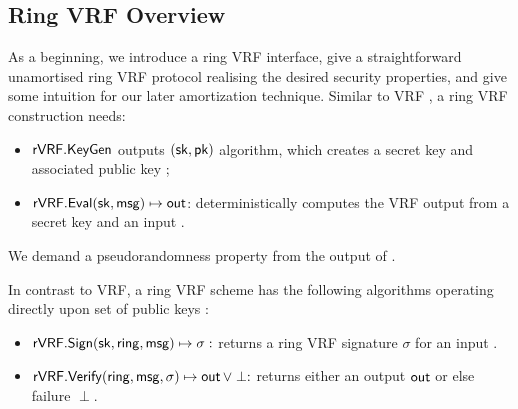 \subsection{Ring VRF Overview}
\label{sec:overview}

As a beginning, we introduce a ring VRF interface, give a straightforward unamortised
 ring VRF protocol realising the desired security properties,
and give some intuition for our later amortization technique.
Similar to VRF \cite{vrf_micali}, a ring VRF construction needs: 

\begin{itemize}
\item ${\mathsf{rVRF}}.{\mathsf{KeyGen}} $ outputs $ (\mathsf{sk}, \mathsf{pk})$ algorithm,
 which creates a secret key \sk and associated public key \pk;

\item ${\mathsf{rVRF}}.{\mathsf{Eval}}(\mathsf{sk},\mathsf{msg}) \mapsto {\ensuremath{\mathsf{out}}}$:  deterministically computes the VRF output \Out from a secret key \sk and an input \msg.
\end{itemize}
%


We demand a pseudorandomness property from the output of \Eval. 


In contrast to VRF, a ring VRF scheme has the following algorithms operating directly upon
 set of public keys \ring:
\begin{itemize}
\item ${\mathsf{rVRF}}.{\mathsf{Sign}}(\mathsf{sk},\mathsf{ring},\mathsf{msg}) \mapsto \sigma:$
    returns a ring VRF signature $\sigma$ for an input \msg.
\item ${\mathsf{rVRF}}.{\mathsf{Verify}}(\mathsf{ring},\mathsf{msg},\sigma) \mapsto {\ensuremath{\mathsf{out}}} \, \lor \perp:$
    returns either an output ${\mathsf{out}}$ or else failure $\perp$.
\end{itemize}


